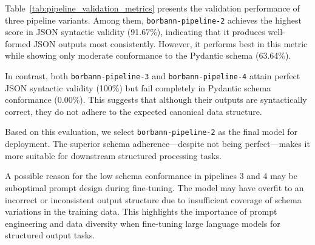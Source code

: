Table~\ref{tab:pipeline_validation_metrics} presents the validation performance of three pipeline variants. Among them, \texttt{borbann-pipeline-2} achieves the highest score in JSON syntactic validity (91.67\%), indicating that it produces well-formed JSON outputs most consistently. However, it performs best in this metric while showing only moderate conformance to the Pydantic schema (63.64\%).

In contrast, both \texttt{borbann-pipeline-3} and \texttt{borbann-pipeline-4} attain perfect JSON syntactic validity (100\%) but fail completely in Pydantic schema conformance (0.00\%). This suggests that although their outputs are syntactically correct, they do not adhere to the expected canonical data structure.

Based on this evaluation, we select \texttt{borbann-pipeline-2} as the final model for deployment. The superior schema adherence—despite not being perfect—makes it more suitable for downstream structured processing tasks.

A possible reason for the low schema conformance in pipelines 3 and 4 may be suboptimal prompt design during fine-tuning. The model may have overfit to an incorrect or inconsistent output structure due to insufficient coverage of schema variations in the training data. This highlights the importance of prompt engineering and data diversity when fine-tuning large language models for structured output tasks.
